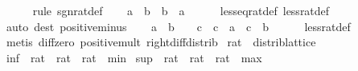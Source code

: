 \begin{isabellebody}
\ \ \ \ \isamarkupfalse%
\ {\isacharparenleft}{\kern0pt}rule\ sgn{\isacharunderscore}{\kern0pt}rat{\isacharunderscore}{\kern0pt}def{\isacharparenright}{\kern0pt}\isanewline
\ \ \isamarkupfalse%
\ {\isachardoublequoteopen}a\ {\isasymle}\ b\ {\isasymor}\ b\ {\isasymle}\ a{\isachardoublequoteclose}\isanewline
\ \ \ \ \isamarkupfalse%
\ less{\isacharunderscore}{\kern0pt}eq{\isacharunderscore}{\kern0pt}rat{\isacharunderscore}{\kern0pt}def\ less{\isacharunderscore}{\kern0pt}rat{\isacharunderscore}{\kern0pt}def\isanewline
\ \ \ \ \isamarkupfalse%
\ {\isacharparenleft}{\kern0pt}auto\ dest{\isacharbang}{\kern0pt}{\isacharcolon}{\kern0pt}\ positive{\isacharunderscore}{\kern0pt}minus{\isacharparenright}{\kern0pt}\isanewline
\ \ \isamarkupfalse%
\ {\isachardoublequoteopen}a\ {\isacharless}{\kern0pt}\ b\ {\isasymLongrightarrow}\ {}\ {\isacharless}{\kern0pt}\ c\ {\isasymLongrightarrow}\ c\ {\isacharasterisk}{\kern0pt}\ a\ {\isacharless}{\kern0pt}\ c\ {\isacharasterisk}{\kern0pt}\ b{\isachardoublequoteclose}\isanewline
\ \ \ \ \isamarkupfalse%
\ less{\isacharunderscore}{\kern0pt}rat{\isacharunderscore}{\kern0pt}def\isanewline
\ \ \ \ \isamarkupfalse%
\ {\isacharparenleft}{\kern0pt}metis\ diff{\isacharunderscore}{\kern0pt}zero\ positive{\isacharunderscore}{\kern0pt}mult\ right{\isacharunderscore}{\kern0pt}diff{\isacharunderscore}{\kern0pt}distrib{\isacharprime}{\kern0pt}{\isacharparenright}{\kern0pt}\isanewline
{}\isamarkupfalse%
%
\endisatagproof
{\isafoldproof}%
%
\isadelimproof
\isanewline
%
\endisadelimproof
\isanewline
{}\isamarkupfalse%
\isanewline
\isanewline
{}\isamarkupfalse%
\ rat\ {\isacharcolon}{\kern0pt}{\isacharcolon}{\kern0pt}\ distrib{\isacharunderscore}{\kern0pt}lattice\isanewline
{}\isanewline
\isanewline
{}\isamarkupfalse%
\ {\isachardoublequoteopen}{\isacharparenleft}{\kern0pt}inf\ {\isacharcolon}{\kern0pt}{\isacharcolon}{\kern0pt}\ rat\ {\isasymRightarrow}\ rat\ {\isasymRightarrow}\ rat{\isacharparenright}{\kern0pt}\ {\isacharequal}{\kern0pt}\ min{\isachardoublequoteclose}\isanewline
\isanewline
{}\isamarkupfalse%
\ {\isachardoublequoteopen}{\isacharparenleft}{\kern0pt}sup\ {\isacharcolon}{\kern0pt}{\isacharcolon}{\kern0pt}\ rat\ {\isasymRightarrow}\ rat\ {\isasymRightarrow}\ rat{\isacharparenright}{\kern0pt}\ {\isacharequal}{\kern0pt}\ max{\isachardoublequoteclose}\isanewline
\isanewline
{}\isamarkupfalse%

\end{isabellebody}
